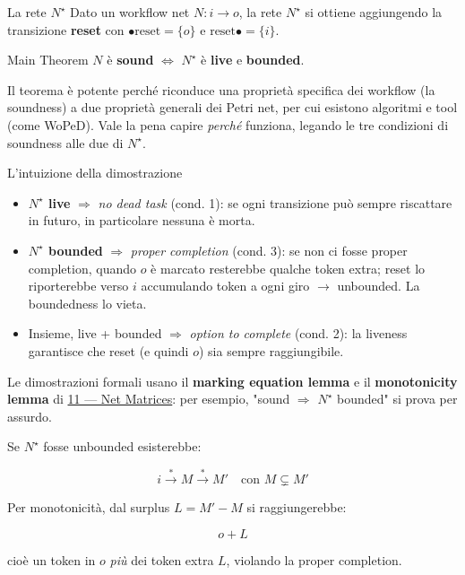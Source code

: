 \begin{boxdefinition}{La rete $N^\star$}
Dato un workflow net $N : i \to o$, la rete $N^\star$ si ottiene aggiungendo la transizione \textbf{reset} con $\bullet\text{reset} = \{o\}$ e $\text{reset}\bullet = \{i\}$.
\end{boxdefinition}

\begin{boxtheorem}{Main Theorem}
$N$ è \textbf{sound} $\iff$ $N^\star$ è \textbf{live} e \textbf{bounded}.
\end{boxtheorem}

Il teorema è potente perché riconduce una proprietà specifica dei workflow (la soundness) a due proprietà generali dei Petri net, per cui esistono algoritmi e tool (come WoPeD). Vale la pena capire \emph{perché} funziona, legando le tre condizioni di soundness alle due di $N^\star$.

\begin{boxabstract}{L'intuizione della dimostrazione}
\begin{itemize}
\item \textbf{$N^\star$ live} $\Longrightarrow$ \emph{no dead task} (cond. 1): se ogni transizione può sempre riscattare in futuro, in particolare nessuna è morta.
\item \textbf{$N^\star$ bounded} $\Longrightarrow$ \emph{proper completion} (cond. 3): se non ci fosse proper completion, quando $o$ è marcato resterebbe qualche token extra; reset lo riporterebbe verso $i$ accumulando token a ogni giro $\rightarrow$ unbounded. La boundedness lo vieta.
\item Insieme, live + bounded $\Longrightarrow$ \emph{option to complete} (cond. 2): la liveness garantisce che reset (e quindi $o$) sia sempre raggiungibile.
\end{itemize}

Le dimostrazioni formali usano il \textbf{marking equation lemma} e il \textbf{monotonicity lemma} di \hyperref[ch:11]{11 — Net Matrices}: per esempio, "sound $\Longrightarrow$ $N^\star$ bounded" si prova per assurdo.

Se $N^\star$ fosse unbounded esisterebbe:

\[
i \xrightarrow{\ast} M \xrightarrow{\ast} M' \quad \text{con } M \subsetneq M'
\]

Per monotonicità, dal surplus $L = M' - M$ si raggiungerebbe:

\[
o + L
\]

cioè un token in $o$ \emph{più} dei token extra $L$, violando la proper completion.
\end{boxabstract}


